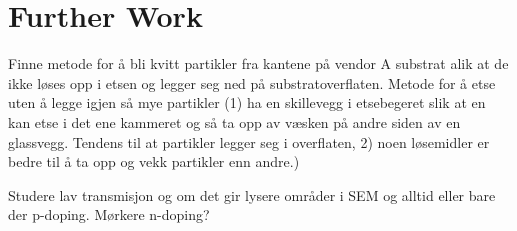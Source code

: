 \chapter{Further Work}\label{ch:further-work}


Finne metode for å bli kvitt partikler fra kantene på vendor A substrat alik at de ikke løses opp i etsen og legger seg ned på substratoverflaten. Metode for å etse uten å legge igjen så mye partikler (1) ha en skillevegg i etsebegeret slik at en kan etse i det ene kammeret og så ta opp av væsken på andre siden av en glassvegg. Tendens til at partikler legger seg i overflaten, 2) noen løsemidler er bedre til å ta opp og vekk partikler enn andre.)

Studere lav transmisjon og om det gir lysere områder i SEM og alltid eller bare der p-doping. Mørkere n-doping?


